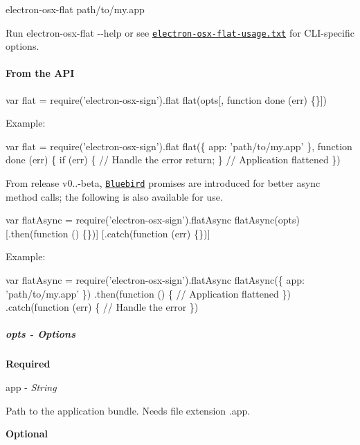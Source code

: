 \begin{DoxyCode}
electron-osx-flat path/to/my.app
\end{DoxyCode}


Run {\ttfamily electron-\/osx-\/flat -\/-\/help} or see \href{https://github.com/electron-userland/electron-osx-sign/blob/master/bin/electron-osx-flat-usage.txt}{\tt electron-\/osx-\/flat-\/usage.\+txt} for C\+L\+I-\/specific options.

\paragraph*{From the A\+PI}


\begin{DoxyCode}
var flat = require('electron-osx-sign').flat
flat(opts[, function done (err) \{\}])
\end{DoxyCode}


Example\+:


\begin{DoxyCode}
var flat = require('electron-osx-sign').flat
flat(\{
  app: 'path/to/my.app'
\}, function done (err) \{
  if (err) \{
    // Handle the error
    return;
  \}
  // Application flattened
\})
\end{DoxyCode}


From release v0..-\/beta, \href{https://github.com/petkaantonov/bluebird}{\tt Bluebird} promises are introduced for better async method calls; the following is also available for use.


\begin{DoxyCode}
var flatAsync = require('electron-osx-sign').flatAsync
flatAsync(opts)
  [.then(function () \{\})]
  [.catch(function (err) \{\})]
\end{DoxyCode}


Example\+:


\begin{DoxyCode}
var flatAsync = require('electron-osx-sign').flatAsync
flatAsync(\{
  app: 'path/to/my.app'
\})
  .then(function () \{
    // Application flattened
  \})
  .catch(function (err) \{
    // Handle the error
  \})
\end{DoxyCode}


\subparagraph*{opts -\/ Options}

{\bfseries Required}

{\ttfamily app} -\/ {\itshape String}

Path to the application bundle. Needs file extension {\ttfamily .app}.

{\bfseries Optional}

